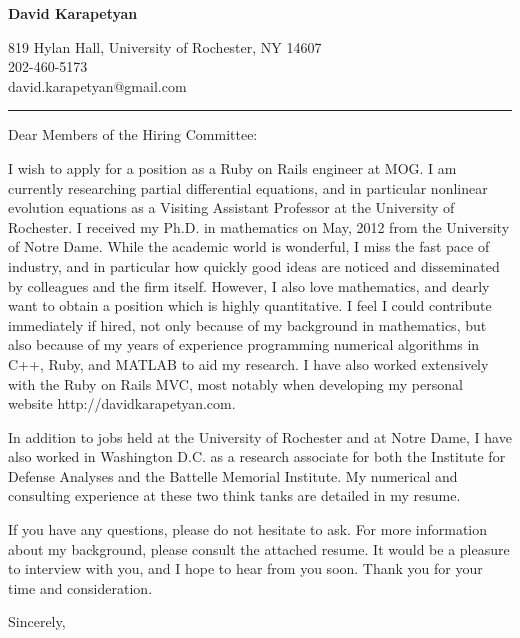\documentclass[12pt]{letter}
\date{\vspace{0.5cm}\flushleft}
\begin{document}
\begin{letter}{}
\begin{center}
{\bf {\Large David Karapetyan}}
\end{center}

\begin{center}
{819 Hylan Hall, University of Rochester, NY 14607  \\ 
202-460-5173 \\  david.karapetyan@gmail.com
}
\end{center}
\hrule

\opening{Dear Members of the Hiring Committee:\\}
%
%
I wish to apply for a position as a Ruby on Rails engineer at MOG\@. I am
currently researching partial differential equations, and in particular
nonlinear evolution equations as a Visiting Assistant Professor at the
University of Rochester. I received my Ph.D. in mathematics on May, 2012 from
the University of Notre Dame. While the academic world is wonderful, I miss the
fast pace of industry, and in particular how quickly good ideas are noticed and
disseminated by colleagues and the firm itself. However, I also love
mathematics, and dearly want to obtain a position which is highly quantitative.
I feel I could contribute immediately if hired, not only because of my
background in mathematics, but also because of my years of experience
programming numerical algorithms in C++, Ruby, and MATLAB to aid my research. I have also worked extensively with the Ruby on Rails MVC, most notably when developing my personal website http://davidkarapetyan.com.

In addition to jobs held at the University of Rochester and at Notre Dame, I
have also worked in Washington D.C. as a research associate for both the
Institute
for Defense Analyses and the Battelle Memorial Institute. My numerical and
consulting experience at these two think tanks are detailed in my resume. 

If you have any questions, please do not hesitate to ask. For more information about my background, please consult the attached resume. It would be a
pleasure to interview with you, and I hope to hear from you soon. Thank you for
your time and consideration. 

\closing{Sincerely,}


\end{letter}
\end{document}
